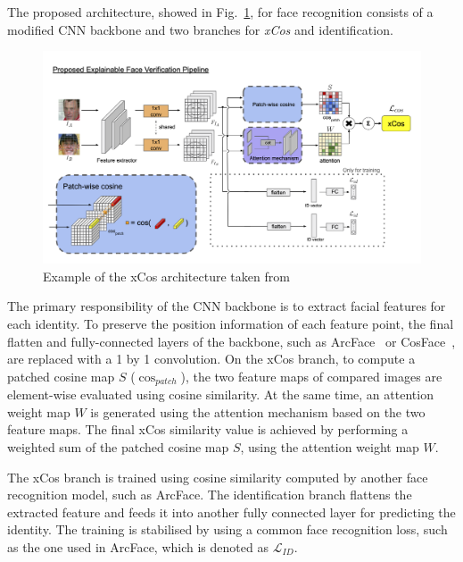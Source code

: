 \noindent The proposed architecture, showed in Fig.~\ref{fig:xCos architecture}, for face recognition consists of a modified CNN backbone and two branches for \textit{xCos} and identification. 
\begin{figure}[!ht]
\centering
  \includegraphics[scale=0.5]{figures/xCos-architecture.png}
  \caption{Example of the xCos architecture taken from~\cite{xCos}}
  \label{fig:xCos architecture}
\end{figure}
The primary responsibility of the CNN backbone is to extract facial features for each identity. To preserve the position information of each feature point, the final flatten and fully-connected layers of the backbone, such as ArcFace~\cite{arcface2018} or CosFace~\cite{cosFace}, are replaced with a \num{1} by \num{1} convolution.
On the xCos branch, to compute a patched cosine map $S$ ($\cos_{patch}$), the two feature maps of compared images are element-wise evaluated using cosine similarity.
At the same time, an attention weight map $W$ is generated using the attention mechanism based on the two feature maps. The final xCos similarity value is achieved by performing a weighted sum of the patched cosine map $S$, using the attention weight map $W$.

\noindent The xCos branch is trained using cosine similarity computed by another face recognition model, such as ArcFace. The identification branch flattens the extracted feature and feeds it into another fully connected layer for predicting the identity. The training is stabilised by using a common face recognition loss, such as the one used in ArcFace, which is denoted as $\mathcal{L}_{ID}$.

